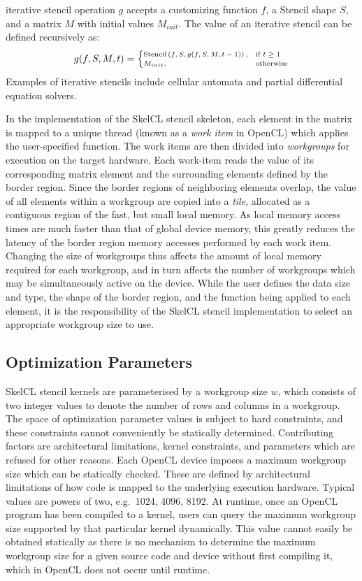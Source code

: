 iterative stencil operation $g$ accepts a customizing function $f$, a
Stencil shape $S$, and a matrix $M$ with initial values
$M_{init}$. The value of an iterative stencil can be defined
recursively as:
%
\begin{equation}
\scriptsize
g(f, S, M, t) =
\begin{cases}
  \stencil \left( f, S, g(f, S, M, t-1) \right),& \text{if } t \geq 1\\
  M_{init}, & \text{otherwise}
\end{cases}
\end{equation}
%
Examples of iterative stencils include cellular automata and partial
differential equation solvers.

In the implementation of the SkelCL stencil skeleton, each element in
the matrix is mapped to a unique thread (known as a \emph{work item}
in OpenCL) which applies the user-specified function. The work items
are then divided into \emph{workgroups} for execution on the target
hardware. Each work-item reads the value of its corresponding matrix
element and the surrounding elements defined by the border
region. Since the border regions of neighboring elements overlap, the
value of all elements within a workgroup are copied into a
\emph{tile}, allocated as a contiguous region of the fast, but small
local memory. As local memory access times are much faster than that
of global device memory, this greatly reduces the latency of the
border region memory accesses performed by each work item. Changing
the size of workgroups thus affects the amount of local memory
required for each workgroup, and in turn affects the number of
workgroups which may be simultaneously active on the device. While the
user defines the data size and type, the shape of the border region,
and the function being applied to each element, it is the
responsibility of the SkelCL stencil implementation to select an
appropriate workgroup size to use.


\subsection{Optimization Parameters}\label{subsec:op-params}

SkelCL stencil kernels are parameterised by a workgroup size $w$,
which consists of two integer values to denote the number of rows and
columns in a workgroup. The space of optimization parameter values is
subject to hard constraints, and these constraints cannot conveniently
be statically determined. Contributing factors are architectural
limitations, kernel constraints, and parameters which are refused for
other reasons.  Each OpenCL device imposes a maximum workgroup size
which can be statically checked. These are defined by architectural
limitations of how code is mapped to the underlying execution
hardware. Typical values are powers of two, e.g.\ 1024, 4096, 8192. At
runtime, once an OpenCL program has been compiled to a kernel, users
can query the maximum workgroup size supported by that particular
kernel dynamically. This value cannot easily be obtained statically as
there is no mechanism to determine the maximum workgroup size for a
given source code and device without first compiling it, which in
OpenCL does not occur until runtime.

